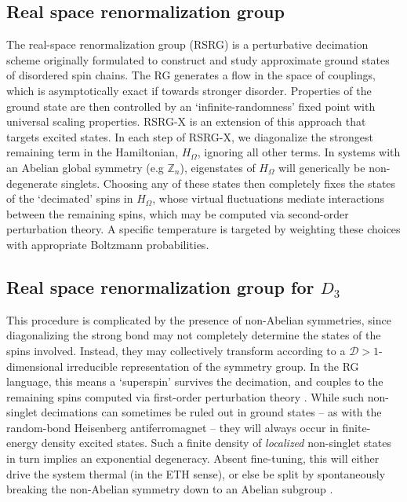 \documentclass[prb,aps, twocolumn, superscriptaddress]{revtex4-1}
\begin{document}
\begin{appendix}
\section{Real space renormalization group}
The real-space renormalization group (RSRG) is a perturbative decimation scheme originally formulated to construct and study approximate ground states of disordered spin chains. The RG generates a flow in the space of couplings, which is asymptotically exact if towards stronger disorder. Properties of the ground state are then controlled by an `infinite-randomness' fixed point with universal scaling properties. RSRG-X is an extension of this approach that targets excited states\cite{PekkerRSRGX,PhysRevB.95.024205}. In each step of RSRG-X, we diagonalize the strongest remaining term in the Hamiltonian, $H_\Omega$, ignoring all other terms. In systems with an Abelian global symmetry (e.g $\mathbb{Z}_n$), eigenstates of  $H_\Omega$ will generically be non-degenerate singlets. Choosing any of these states then completely fixes the states of the `decimated' spins in $H_\Omega$, whose virtual fluctuations mediate interactions between the remaining spins, which may be computed via second-order perturbation theory. A specific temperature is targeted by weighting these choices with appropriate Boltzmann probabilities.

\subsection{Real space renormalization group for $D_3$} 
\label{subsec:s3rg}
This procedure is complicated by the presence of non-Abelian symmetries, since diagonalizing the strong bond may not completely determine the states of the spins involved. Instead, they may collectively transform according to a $\mathcal{D}>1$- dimensional irreducible representation of the symmetry group. In the RG language, this means a `superspin' survives the decimation, and couples to the remaining spins computed via first-order perturbation theory%
. While such non-singlet decimations can sometimes be ruled out in ground states -- as with the random-bond Heisenberg antiferromagnet  -- they will always occur in finite-energy density excited states. Such a finite density of {\it localized} non-singlet states in turn implies an exponential degeneracy. Absent fine-tuning, this will either drive the system thermal (in the ETH sense), or else be split by spontaneously breaking the non-Abelian symmetry down to an Abelian subgroup\cite{XXZPaper,PhysRevB.94.224206}
. 


\end{appendix}
\end{document}
